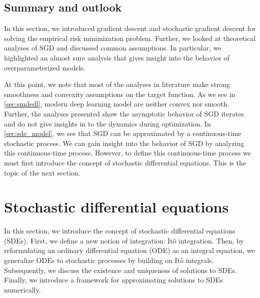 \documentclass[12pt]{article}
\theoremstyle{definition}
\numberwithin{equation}{section}
\begin{document}
\subsection{Summary and outlook}
In this section, we introduced gradient descent and stochastic gradient descent for solving the empirical risk minimization problem. Further, we looked at theoretical analyses of SGD and discussed common assumptions. In particular, we highlighted an almost sure analysis that gives insight into the behavior of overparameterized models. 

At this point, we note that most of the analyses in literature make strong smoothness and convexity assumptions on the target function. As we see in \autoref{sec:smdedl}, modern deep learning model are neither convex nor smooth. Further, the analyses presented show the asymptotic behavior of SGD iterates and do not give insights in to the dynamics during optimization. 
In \autoref{sec:sde_model}, we see that SGD can be approximated by a continuous-time stochastic process. We can gain insight into the behavior of SGD by analyzing this continuous-time process. However, to define this continuous-time process we must first introduce the concept of stochastic differential equations. This is the topic of the next section.


\section{Stochastic differential equations}
\label{sec:BackgroundSDETheory}
In this section, we introduce the concept of stochastic differential equations (SDEs). First, we define a new notion of integration: Itô integration. Then, by reformulating an ordinary differential equation (ODE) as an integral equation, we generalize ODEs to stochastic processes by building on Itô integrals. Subsequently, we discuss the existence and uniqueness of solutions to SDEs. Finally, we introduce a framework for approximating solutions to SDEs numerically.
\end{document}
